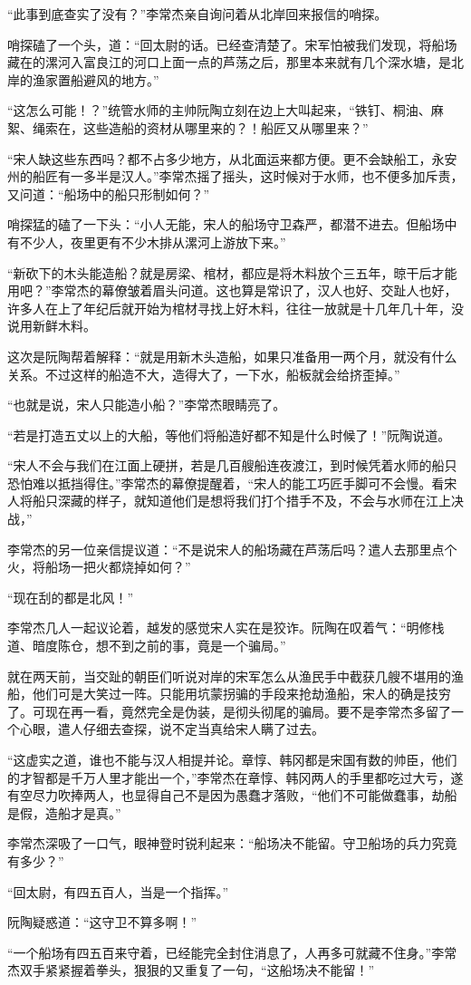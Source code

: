 “此事到底查实了没有？”李常杰亲自询问着从北岸回来报信的哨探。

哨探磕了一个头，道：“回太尉的话。已经查清楚了。宋军怕被我们发现，将船场藏在的漯河入富良江的河口上面一点的芦荡之后，那里本来就有几个深水塘，是北岸的渔家置船避风的地方。”

“这怎么可能！？”统管水师的主帅阮陶立刻在边上大叫起来，“铁钉、桐油、麻絮、绳索在，这些造船的资材从哪里来的？！船匠又从哪里来？”

“宋人缺这些东西吗？都不占多少地方，从北面运来都方便。更不会缺船工，永安州的船匠有一多半是汉人。”李常杰摇了摇头，这时候对于水师，也不便多加斥责，又问道：“船场中的船只形制如何？”

哨探猛的磕了一下头：“小人无能，宋人的船场守卫森严，都潜不进去。但船场中有不少人，夜里更有不少木排从漯河上游放下来。”

“新砍下的木头能造船？就是房梁、棺材，都应是将木料放个三五年，晾干后才能用吧？”李常杰的幕僚皱着眉头问道。这也算是常识了，汉人也好、交趾人也好，许多人在上了年纪后就开始为棺材寻找上好木料，往往一放就是十几年几十年，没说用新鲜木料。

这次是阮陶帮着解释：“就是用新木头造船，如果只准备用一两个月，就没有什么关系。不过这样的船造不大，造得大了，一下水，船板就会给挤歪掉。”

“也就是说，宋人只能造小船？”李常杰眼睛亮了。

“若是打造五丈以上的大船，等他们将船造好都不知是什么时候了！”阮陶说道。

“宋人不会与我们在江面上硬拼，若是几百艘船连夜渡江，到时候凭着水师的船只恐怕难以抵挡得住。”李常杰的幕僚提醒着，“宋人的能工巧匠手脚可不会慢。看宋人将船只深藏的样子，就知道他们是想将我们打个措手不及，不会与水师在江上决战，”

李常杰的另一位亲信提议道：“不是说宋人的船场藏在芦荡后吗？遣人去那里点个火，将船场一把火都烧掉如何？”

“现在刮的都是北风！”

李常杰几人一起议论着，越发的感觉宋人实在是狡诈。阮陶在叹着气：“明修栈道、暗度陈仓，想不到之前的事，竟是一个骗局。”

就在两天前，当交趾的朝臣们听说对岸的宋军怎么从渔民手中截获几艘不堪用的渔船，他们可是大笑过一阵。只能用坑蒙拐骗的手段来抢劫渔船，宋人的确是技穷了。可现在再一看，竟然完全是伪装，是彻头彻尾的骗局。要不是李常杰多留了一个心眼，遣人仔细去查探，说不定当真给宋人瞒了过去。

“这虚实之道，谁也不能与汉人相提并论。章惇、韩冈都是宋国有数的帅臣，他们的才智都是千万人里才能出一个，”李常杰在章惇、韩冈两人的手里都吃过大亏，遂有空尽力吹捧两人，也显得自己不是因为愚蠢才落败，“他们不可能做蠢事，劫船是假，造船才是真。”

李常杰深吸了一口气，眼神登时锐利起来：“船场决不能留。守卫船场的兵力究竟有多少？”

“回太尉，有四五百人，当是一个指挥。”

阮陶疑惑道：“这守卫不算多啊！”

“一个船场有四五百来守着，已经能完全封住消息了，人再多可就藏不住身。”李常杰双手紧紧握着拳头，狠狠的又重复了一句，“这船场决不能留！”

